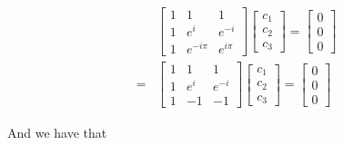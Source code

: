 \documentclass[12pt]{article}
\begin{document}
{\begin{enumerate}[label=(\alph*)]
        \begin{align*}
          &\begin{bmatrix}
            1 & 1 & 1 \\
            1 & e^i & e^{-i} \\
            1 & e^{-i\pi} & e^{i\pi}
          \end{bmatrix}
          \begin{bmatrix}
            c_1 \\
            c_2 \\
            c_3
          \end{bmatrix}
          =
          \begin{bmatrix}
            0 \\
            0 \\
            0
          \end{bmatrix} \\
        =&\begin{bmatrix}
            1 & 1 & 1 \\
            1 & e^i & e^{-i} \\
            1 & -1 & -1
          \end{bmatrix}
          \begin{bmatrix}
            c_1 \\
            c_2 \\
            c_3
          \end{bmatrix}
          =
          \begin{bmatrix}
            0 \\
            0 \\
            0
          \end{bmatrix}
        \end{align*}

        And we have that


\end{enumerate}}
\end{document}
